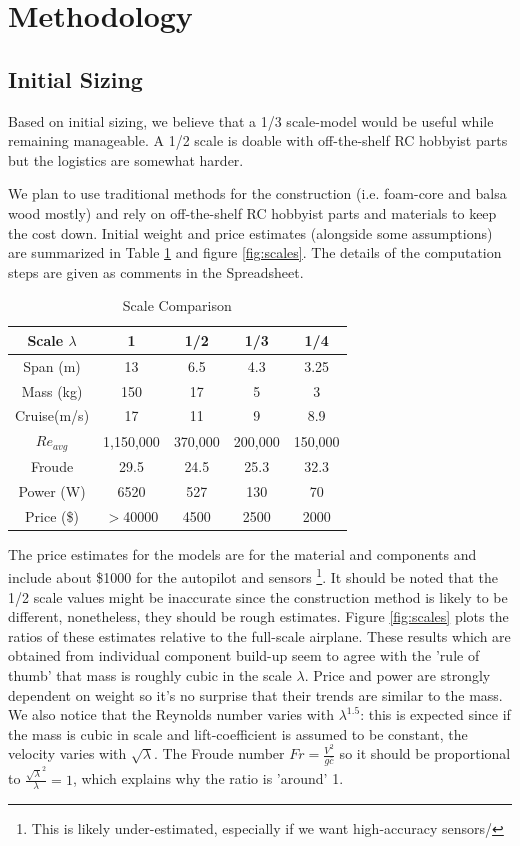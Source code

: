 \documentclass[titlepage,10pt]{article}
\begin{document}
\section{Methodology}
\subsection{Initial Sizing}
Based on initial sizing, we believe that a 1/3 scale-model would be useful while remaining manageable. A 1/2 scale is doable with off-the-shelf RC hobbyist parts but the logistics are somewhat harder.


We plan to use traditional methods for the construction (i.e. foam-core and balsa wood mostly) and rely on off-the-shelf RC hobbyist parts and materials to keep the cost down. Initial weight and price estimates (alongside some assumptions) are summarized in Table \ref{tab:scales} and figure \ref{fig:scales}. The details of the computation steps are given as comments in the Spreadsheet.

\begin{table}[h]
\begin{center}
\begin{tabular}{|c|c|c|c|c|}
\hline
Scale $\lambda$	& 1 & 1/2 & 1/3 & 1/4 \\ \hline
Span (m)	& 13& 6.5 & 4.3 & 3.25\\ 
Mass (kg)	& 150& 17 & 5   & 3 \\
Cruise(m/s)	& 17 & 11 & 9   & 8.9 \\
$Re_{avg}$  	& 1,150,000 & 370,000 & 200,000 & 150,000 \\
Froude		& 29.5 & 24.5 & 25.3 & 32.3 \\
Power (W)	& 6520 & 527 & 130 & 70 \\
Price (\$)      & $>$40000 & 4500 & 2500 & 2000 \\
\hline
\end{tabular}
\caption{Scale Comparison}
\label{tab:scales}
\end{center}
\end{table}


The price estimates for the models are for the material and components and include about \$1000 for the autopilot and sensors \footnote{This is likely under-estimated, especially if we want high-accuracy sensors/}. It should be noted that the 1/2 scale values might be inaccurate since the construction method is likely to be different, nonetheless, they should be rough estimates. Figure \ref{fig:scales} plots the ratios of these estimates relative to the full-scale airplane. These results which are obtained from individual component build-up seem to agree with the 'rule of thumb' that mass is roughly cubic in the scale $\lambda$. Price and power are strongly dependent on weight so it's no surprise that their trends are similar to the mass. We also notice that the Reynolds number varies with $\lambda^{1.5}$: this is expected since if the mass is cubic in scale and lift-coefficient is assumed to be constant, the velocity varies with $\sqrt{\lambda}$. The Froude number $Fr =\frac{V^2}{g \bar{c}}$ so it should be proportional to $\frac{{\sqrt{\lambda}}^2}{\lambda}=1$, which explains why the ratio is 'around' 1.
\end{document}
